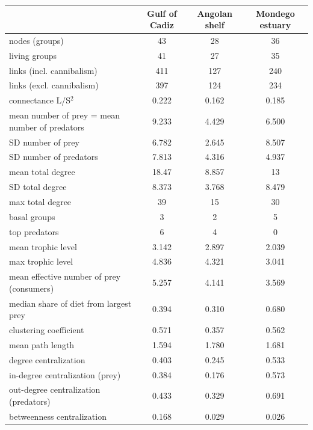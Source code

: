 \begin{tabular}{lccc}
\hline
 & Gulf of Cadiz & Angolan shelf & Mondego estuary \\
\hline
nodes (groups) & 43 & 28 & 36 \\
living groups & 41 & 27 & 35 \\
links (incl. cannibalism) & 411 & 127 & 240 \\
links (excl. cannibalism) & 397 & 124 & 234 \\
connectance L/S$^2$ & 0.222 & 0.162 & 0.185 \\
mean number of prey = mean number of predators & 9.233 & 4.429 & 6.500 \\
SD number of prey & 6.782 & 2.645 & 8.507 \\
SD number of predators & 7.813 & 4.316 & 4.937 \\
mean total degree & 18.47 & 8.857 & 13 \\
SD total degree & 8.373 & 3.768 & 8.479 \\
max total degree & 39 & 15 & 30 \\
basal groups & 3 & 2 & 5 \\
top predators & 6 & 4 & 0 \\
mean trophic level & 3.142 & 2.897 & 2.039 \\
max trophic level & 4.836 & 4.321 & 3.041 \\
mean effective number of prey (consumers) & 5.257 & 4.141 & 3.569 \\
median share of diet from largest prey & 0.394 & 0.310 & 0.680 \\
clustering coefficient & 0.571 & 0.357 & 0.562 \\
mean path length & 1.594 & 1.780 & 1.681 \\
degree centralization & 0.403 & 0.245 & 0.533 \\
in-degree centralization (prey) & 0.384 & 0.176 & 0.573 \\
out-degree centralization (predators) & 0.433 & 0.329 & 0.691 \\
betweenness centralization & 0.168 & 0.029 & 0.026 \\
\hline
\end{tabular}
